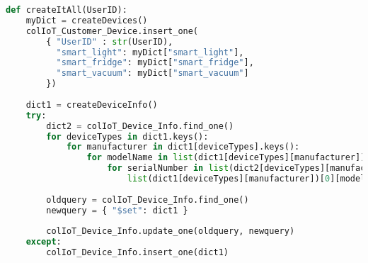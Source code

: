 \begin{lstlisting}[language=Python, caption=Showcase of createItAll function]
def createItAll(UserID):
    myDict = createDevices()
    colIoT_Customer_Device.insert_one(
        { "UserID" : str(UserID),
          "smart_light": myDict["smart_light"],
          "smart_fridge": myDict["smart_fridge"],
          "smart_vacuum": myDict["smart_vacuum"]
        })
    
    dict1 = createDeviceInfo()
    try:
        dict2 = colIoT_Device_Info.find_one()
        for deviceTypes in dict1.keys():
            for manufacturer in dict1[deviceTypes].keys():
                for modelName in list(dict1[deviceTypes][manufacturer])[0].keys():
                    for serialNumber in list(dict2[deviceTypes][manufacturer])[0][modelName]["Serial_Numbers"]:
                        list(dict1[deviceTypes][manufacturer])[0][modelName]["Serial_Numbers"].append(serialNumber)
        
        oldquery = colIoT_Device_Info.find_one()
        newquery = { "$set": dict1 }
        
        colIoT_Device_Info.update_one(oldquery, newquery)
    except:
        colIoT_Device_Info.insert_one(dict1)
\end{lstlisting}